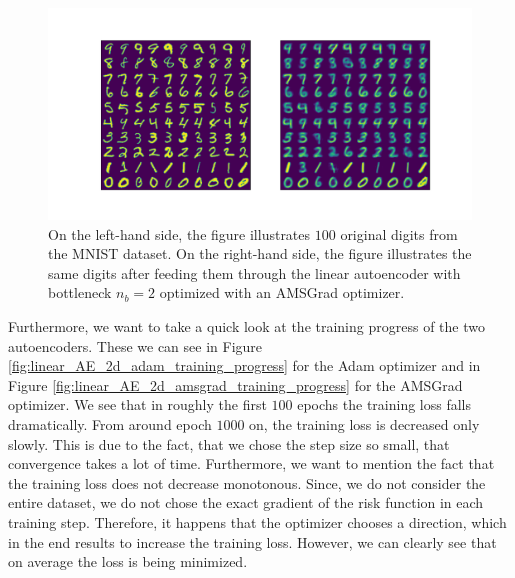 \begin{figure}
\begin{center}
   \begin{minipage}[b]{\linewidth}
      \includegraphics[trim = 15mm 10mm 15mm 15mm, clip, width=\linewidth]{linear_AE_2d_amsgrad_inference}
	\end{minipage}
\end{center}
\caption{On the left-hand side, the figure illustrates $100$ original digits from the MNIST dataset. On the right-hand side, the figure illustrates the same digits after feeding them through the linear autoencoder with bottleneck $n_b=2$ optimized with an AMSGrad optimizer.}\label{fig:linear_AE_2d_amsgrad_inference}
\end{figure}


Furthermore, we want to take a quick look at the training progress of the two autoencoders. These we can see in Figure \ref{fig:linear_AE_2d_adam_training_progress} for the Adam optimizer and in Figure \ref{fig:linear_AE_2d_amsgrad_training_progress} for the AMSGrad optimizer. We see that in roughly the first $100$ epochs the training loss falls dramatically. From around epoch $1000$ on, the training loss is decreased only slowly. This is due to the fact, that we chose the step size so small, that convergence takes a lot of time. Furthermore, we want to mention the fact that the training loss does not decrease monotonous. Since, we do not consider the entire dataset, we do not chose the exact gradient of the risk function in each training step. Therefore, it happens that the optimizer chooses a direction, which in the end results to increase the training loss. However, we can clearly see that on average the loss is being minimized.


